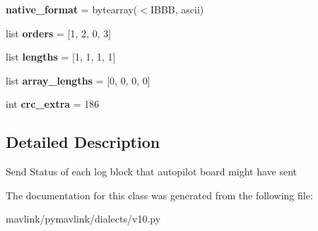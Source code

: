 \begin{DoxyCompactItemize}
\item 
\mbox{\label{classpymavlink_1_1dialects_1_1v10_1_1MAVLink__remote__log__block__status__message_a2cbaa916c39a7f1c40f3719aaa7cf095}} 
{\bfseries native\+\_\+format} = bytearray(\textquotesingle{}$<$I\+B\+BB\textquotesingle{}, \textquotesingle{}ascii\textquotesingle{})
\item 
\mbox{\label{classpymavlink_1_1dialects_1_1v10_1_1MAVLink__remote__log__block__status__message_ad0581ad1d1707a2b0a1b467af2744538}} 
list {\bfseries orders} = \mbox{[}1, 2, 0, 3\mbox{]}
\item 
\mbox{\label{classpymavlink_1_1dialects_1_1v10_1_1MAVLink__remote__log__block__status__message_a4d43daa43a0fbefdb32ad57c6f7856d9}} 
list {\bfseries lengths} = \mbox{[}1, 1, 1, 1\mbox{]}
\item 
\mbox{\label{classpymavlink_1_1dialects_1_1v10_1_1MAVLink__remote__log__block__status__message_a983ac4834f1dd4d0e1160ceec14ebeb7}} 
list {\bfseries array\+\_\+lengths} = \mbox{[}0, 0, 0, 0\mbox{]}
\item 
\mbox{\label{classpymavlink_1_1dialects_1_1v10_1_1MAVLink__remote__log__block__status__message_aa8b3ecfe0ad9b4bbc682a8eee79a8f33}} 
int {\bfseries crc\+\_\+extra} = 186
\end{DoxyCompactItemize}


\subsection{Detailed Description}
\begin{DoxyVerb}Send Status of each log block that autopilot board might have
sent
\end{DoxyVerb}
 

The documentation for this class was generated from the following file\+:\begin{DoxyCompactItemize}
\item 
mavlink/pymavlink/dialects/v10.\+py\end{DoxyCompactItemize}

